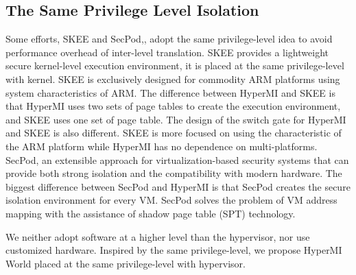\documentclass[conference]{IEEEtran}
\begin{document}
\subsection{The Same Privilege Level Isolation}
Some efforts, 
 SKEE\cite{Azab2016SKEE} and SecPod\cite{Wang2015SecPod},\cite{Deng2017Dancing}, adopt the same privilege-level idea to avoid performance overhead of inter-level translation.
 SKEE provides a lightweight secure kernel-level execution environment, it is placed at the same privilege-level with kernel. SKEE is exclusively designed for commodity ARM platforms using system characteristics of ARM. The difference between HyperMI and SKEE is that HyperMI uses two sets of page tables to create the execution environment, and SKEE uses one set of page table. The design of the switch gate for HyperMI and SKEE is also different. SKEE is more focused on using the characteristic of the ARM platform while HyperMI has no dependence on multi-platforms.
SecPod, an extensible approach for virtualization-based security systems that can provide both strong isolation and the compatibility with modern hardware. The biggest difference between SecPod and HyperMI is that SecPod creates the secure isolation environment for every VM. SecPod solves the problem of VM address mapping with the assistance of shadow page table (SPT) technology.

We neither adopt software at a higher level than the hypervisor, nor use customized hardware. Inspired by the same privilege-level, we propose HyperMI World placed at the same privilege-level with hypervisor.
\end{document}
